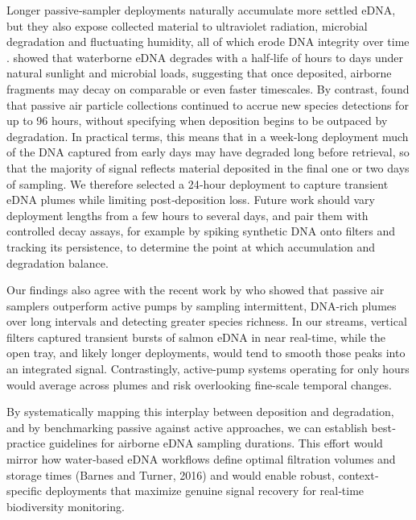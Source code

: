\documentclass{article}
\begin{document}
Longer passive‐sampler deployments naturally accumulate more settled eDNA, but they also expose collected material to ultraviolet radiation, microbial degradation and fluctuating humidity, all of which erode DNA integrity over time \cite{brandao-dias2023}. \cite{strickler2015} showed that waterborne eDNA degrades with a half‐life of hours to days under natural sunlight and microbial loads, suggesting that once deposited, airborne fragments may decay on comparable or even faster timescales. By contrast, \cite{klepke2022} found that passive air particle collections continued to accrue new species detections for up to 96 hours, without specifying when deposition begins to be outpaced by degradation. In practical terms, this means that in a week-long deployment much of the DNA captured from early days may have degraded long before retrieval, so that the majority of signal reflects material deposited in the final one or two days of sampling. We therefore selected a 24‐hour deployment to capture transient eDNA plumes while limiting post‐deposition loss\cite{johnson2023}. Future work should vary deployment lengths from a few hours to several days, and pair them with controlled decay assays, for example by spiking synthetic DNA onto filters and tracking its persistence, to determine the point at which accumulation and degradation balance.

Our findings also agree with the recent work by \cite{jager2025} who showed that passive air samplers outperform active pumps by sampling intermittent, DNA-rich plumes over long intervals and detecting greater species richness. In our streams, vertical filters captured transient bursts of salmon eDNA in near real-time, while the open tray, and likely longer deployments, would tend to smooth those peaks into an integrated signal. Contrastingly, active-pump systems operating for only hours would average across plumes and risk overlooking fine-scale temporal changes.

By systematically mapping this interplay between deposition and degradation, and by benchmarking passive against active approaches, we can establish best‐practice guidelines for airborne eDNA sampling durations. This effort would mirror how water‐based eDNA workflows define optimal filtration volumes and storage times (Barnes and Turner, 2016) \cite{altermatt2025} and would enable robust, context‐specific deployments that maximize genuine signal recovery for real‐time biodiversity monitoring.

\end{document}
